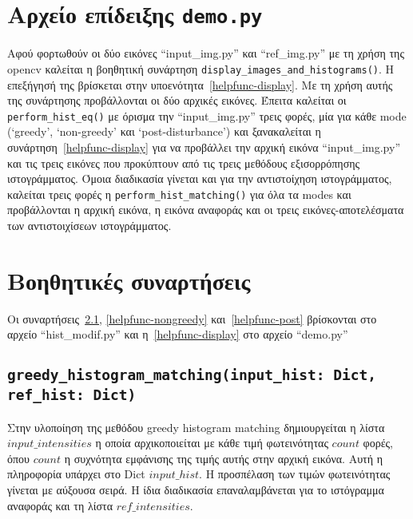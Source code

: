 \documentclass{article}
\begin{document}
\section{Αρχείο επίδειξης \texttt{demo.py}}
Αφού φορτωθούν οι δύο εικόνες ``input\_img.py'' και ``ref\_img.py'' με τη χρήση 
της opencv καλείται η βοηθητική συνάρτηση \verb|display_images_and_histograms()|.
Η επεξήγησή της βρίσκεται στην υποενότητα~\ref{helpfunc-display}. Με τη χρήση 
αυτής της συνάρτησης προβάλλονται οι δύο αρχικές εικόνες. Έπειτα καλείται οι
\verb|perform_hist_eq()| με όρισμα την ``input\_img.py'' τρεις φορές, μία
για κάθε mode (`greedy', `non-greedy' και `post-disturbance') και ξανακαλείται η
συνάρτηση~\ref{helpfunc-display} για να προβάλλει την αρχική εικόνα ``input\_img.py''
και τις τρεις εικόνες που προκύπτουν από τις τρεις μεθόδους εξισορρόπησης 
ιστογράμματος. Όμοια διαδικασία γίνεται και για την αντιστοίχηση ιστογράμματος, 
καλείται τρεις φορές η \verb|perform_hist_matching()| για όλα τα modes και 
προβά\-λλονται η αρχική εικόνα, η εικόνα αναφοράς και οι τρεις εικόνες-αποτελέσματα 
των αντιστοιχίσεων ιστογράμ\-ματος.

\section{Βοηθητικές συναρτήσεις}
Οι συναρτήσεις~\ref{helpfunc-greedy}, \ref{helpfunc-nongreedy} και~\ref{helpfunc-post} βρίσκονται στο αρχείο ``hist\_modif.py'' και 
η~\ref{helpfunc-display} στο αρχείο ``demo.py''

\subsection{\texttt{greedy\_histogram\_matching(input\_hist: Dict, ref\_hist: Dict)}}\label{helpfunc-greedy}
Στην υλοποίηση της μεθόδου greedy histogram matching δημιουργείται η λίστα 
$input\_intensities$ η οποία αρχι\-κοποι\-είται με
κάθε τιμή φωτεινότητας $count$ φορές, όπου $count$ η 
συχνότητα εμφάνισης της τιμής αυτής στην αρχική εικόνα. Αυτή η 
πληροφορία υπάρχει στο Dict $input\_hist$. Η προσπέλαση των τιμών 
φωτεινότητας γίνεται με αύξουσα σειρά.
Η ίδια διαδικασία επαναλαμβάνεται για το ιστόγραμμα αναφοράς
και τη λίστα $ref\_intensities$.
\end{document}
